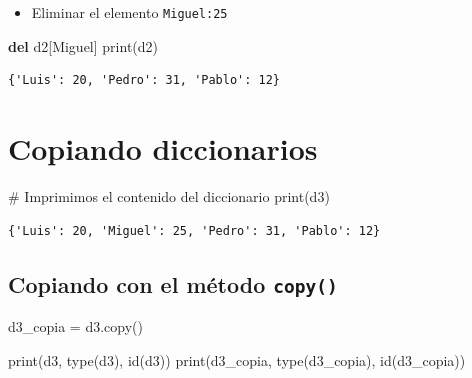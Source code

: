 \documentclass[
  spanish,
  letterpaper,
]{scrbook}
\newenvironment{Shaded}{\begin{snugshade}}{\end{snugshade}}
\newcommand{\BuiltInTok}[1]{\textcolor[rgb]{0.00,0.23,0.31}{#1}}
\newcommand{\CommentTok}[1]{\textcolor[rgb]{0.37,0.37,0.37}{#1}}
\newcommand{\KeywordTok}[1]{\textcolor[rgb]{0.00,0.23,0.31}{\textbf{#1}}}
\newcommand{\NormalTok}[1]{\textcolor[rgb]{0.00,0.23,0.31}{#1}}
\newcommand{\OperatorTok}[1]{\textcolor[rgb]{0.37,0.37,0.37}{#1}}
\newcommand{\StringTok}[1]{\textcolor[rgb]{0.13,0.47,0.30}{#1}}
\providecommand{\tightlist}{%
  \setlength{\itemsep}{0pt}\setlength{\parskip}{0pt}}
\theoremstyle{definition}
\theoremstyle{remark}
\begin{document}
\begin{itemize}
\tightlist
\item
  Eliminar el elemento
  \texttt{\textquotesingle{}Miguel\textquotesingle{}:25}
\end{itemize}

\begin{Shaded}
\begin{Highlighting}[]
\KeywordTok{del}\NormalTok{ d2[}\StringTok{\textquotesingle{}Miguel\textquotesingle{}}\NormalTok{] }
\BuiltInTok{print}\NormalTok{(d2)}
\end{Highlighting}
\end{Shaded}

\begin{verbatim}
{'Luis': 20, 'Pedro': 31, 'Pablo': 12}
\end{verbatim}

\section{Copiando diccionarios}\label{copiando-diccionarios}

\begin{Shaded}
\begin{Highlighting}[]
\CommentTok{\# Imprimimos el contenido del diccionario}
\BuiltInTok{print}\NormalTok{(d3)}
\end{Highlighting}
\end{Shaded}

\begin{verbatim}
{'Luis': 20, 'Miguel': 25, 'Pedro': 31, 'Pablo': 12}
\end{verbatim}

\subsection{\texorpdfstring{Copiando con el método
\texttt{copy()}}{Copiando con el método copy()}}\label{copiando-con-el-muxe9todo-copy-2}

\begin{Shaded}
\begin{Highlighting}[]
\NormalTok{d3\_copia }\OperatorTok{=}\NormalTok{ d3.copy()}

\BuiltInTok{print}\NormalTok{(d3, }\BuiltInTok{type}\NormalTok{(d3), }\BuiltInTok{id}\NormalTok{(d3))}
\BuiltInTok{print}\NormalTok{(d3\_copia, }\BuiltInTok{type}\NormalTok{(d3\_copia), }\BuiltInTok{id}\NormalTok{(d3\_copia))}
\end{Highlighting}
\end{Shaded}
\end{document}
